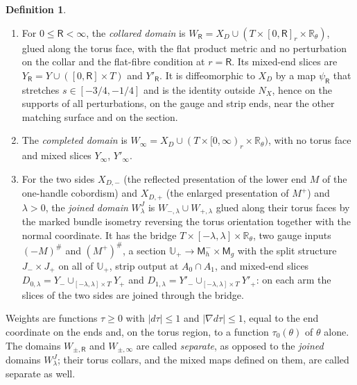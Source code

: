 \documentclass[11pt]{amsart}
\theoremstyle{definition}
\newtheorem{definition}[theorem]{Definition}
\theoremstyle{remark}
\theoremstyle{plain}
\numberwithin{equation}{section}
\newcommand{\RR}{\mathbb{R}}
\newcommand{\Msf}{\mathsf{M}}
\begin{document}
\begin{definition}\label{def:torus-domains}
\begin{enumerate}[label=(\alph*)]
\item For $0\le \mathsf R<\infty$, the \emph{collared domain} is
  $W_\mathsf R=X_D\cup(T\times[0,\mathsf R]_r\times\RR_\theta)$, glued along the torus face,
  with the flat product metric and no perturbation on the collar and the
  flat-fibre condition at $r=\mathsf R$. Its mixed-end slices are
  $Y_\mathsf R=Y\cup([0,\mathsf R]\times T)$ and $Y'_\mathsf R$. It is diffeomorphic to $X_D$ by a map
  $\psi_\mathsf R$ that stretches $s\in[-3/4,-1/4]$ and is the identity outside $N_X$,
  hence on the supports of all perturbations, on the gauge and strip ends,
  near the other matching surface and on the section.
\item The \emph{completed domain} is $W_\infty=X_D\cup(T\times[0,\infty)_r\times
  \RR_\theta)$, with no torus face and mixed slices $Y_\infty$, $Y'_\infty$.
\item For the two sides $X_{D,-}$ (the reflected presentation of the lower end $M$
  of the one-handle cobordism) and
  $X_{D,+}$ (the enlarged presentation of $M^+$) and $\lambda>0$, the
  \emph{joined domain} $W^J_\lambda$ is $W_{-,\lambda}\cup W_{+,\lambda}$ glued along
  their torus faces by the marked bundle isometry reversing the torus
  orientation together with the normal coordinate. It has the bridge
  $T\times[-\lambda,\lambda]\times\RR_\theta$, two gauge inputs $(-M)^\#$ and
  $(M^+)^\#$, a section $\mathbb U_+\to\Msf_h^-\times\Msf_g$ with the split structure
  $J_-\times J_+$ on all of $\mathbb U_+$, strip output at $A_0\cap A_1$, and mixed-end
  slices $D_{0,\lambda}=Y_-\cup_{[-\lambda,\lambda]\times T}Y_+$ and
  $D_{1,\lambda}=Y'_-\cup_{[-\lambda,\lambda]\times T}Y'_+$: on each arm the slices of the
  two sides are joined through the bridge.
\end{enumerate}
Weights are functions $\tau\ge0$ with $|d\tau|\le1$ and $|\nabla d\tau|\le1$, equal to
the end coordinate on the ends and, on the torus region, to a function
$\tau_0(\theta)$ of $\theta$ alone. The domains $W_{\pm,\mathsf R}$ and $W_{\pm,\infty}$ are
called \emph{separate}, as opposed to the \emph{joined} domains $W^J_\lambda$; their torus
collars, and the mixed maps defined on them, are called separate as well.
\end{definition}
\end{document}
